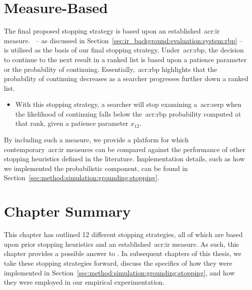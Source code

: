 \vspace*{-4mm}
\section{Measure-Based}
\vspace*{-2mm}
The final proposed stopping strategy is based upon an established~\gls{acr:ir} measure.~ -- as discussed in Section~\ref{sec:ir_background:evaluation:system:rbp} -- is utilised as the basis of our final stopping strategy. Under~\gls{acr:rbp}, the decision to continue to the next result in a ranked list is based upon a patience parameter or the probability of continuing. Essentially,~\gls{acr:rbp} highlights that the probability of continuing decreases as a searcher progresses further down a ranked list.

\vspace*{-5mm}
\begin{itemize}
    \item{ With this stopping strategy, a searcher will stop examining a~\gls{acr:serp} when the likelihood of continuing falls below the~\gls{acr:rbp} probability computed at that rank, given a patience parameter $x_{12}$.}
    
\end{itemize}

By including such a measure, we provide a platform for which contemporary~\gls{acr:ir} measures can be compared against the performance of other stopping heuristics defined in the literature. Implementation details, such as how we implemented the probabilistic component, can be found in Section~\ref{sec:method:simulation:grounding:stopping}.

\section{Chapter Summary}
This chapter has outlined 12 different stopping strategies, all of which are based upon prior stopping heuristics and an established~\gls{acr:ir} measure. As such, this chapter provides a possible answer to . In subsequent chapters of this thesis, we take these stopping strategies forward, discuss the specifics of how they were implemented in Section~\ref{sec:method:simulation:grounding:stopping}, and how they were employed in our empirical experimentation.